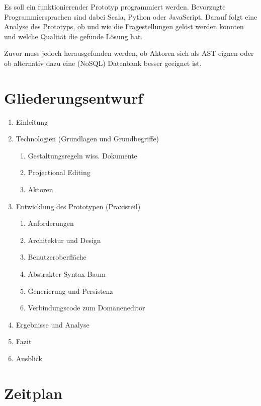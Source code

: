 
Es soll ein funktionierender Prototyp programmiert werden.
Bevorzugte Programmiersprachen sind dabei Scala, Python oder JavaScript.
Darauf folgt eine Analyse des Prototyps, ob und wie die Fragestellungen
gelöst werden konnten und welche Qualität die gefunde Lösung hat.

Zuvor muss jedoch herausgefunden werden, ob Aktoren sich als AST eignen
oder ob alternativ dazu eine (NoSQL) Datenbank besser geeignet ist.


\section{Gliederungsentwurf}

\renewcommand{\labelenumii}{\theenumii}
\renewcommand{\theenumii}{\theenumi.\arabic{enumii}.}

\begin{enumerate}
    \item Einleitung
    \item Technologien (Grundlagen und Grundbegriffe)
    \begin{enumerate}
        \item Gestaltungsregeln wiss. Dokumente
        \item Projectional Editing
        \item Aktoren
    \end{enumerate}
    \item Entwicklung des Prototypen (Praxisteil)
    \begin{enumerate}
        \item Anforderungen
        \item Architektur und Design
        \item Benutzeroberfläche
        \item Abstrakter Syntax Baum
        \item Generierung und Persistenz
        \item Verbindungscode zum Domäneneditor
    \end{enumerate}
    \item Ergebnisse und Analyse
    \item Fazit
    \item Ausblick
\end{enumerate}



\section{Zeitplan}

